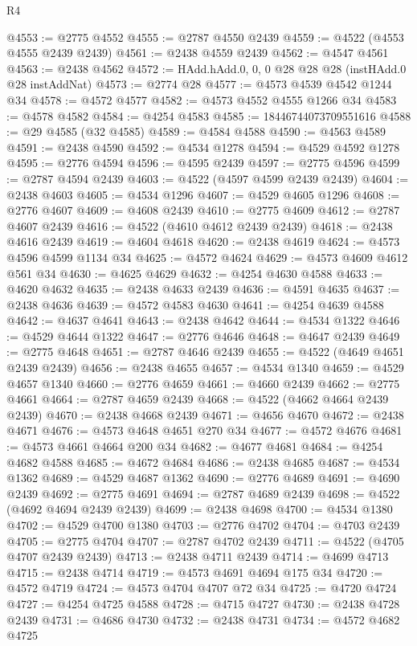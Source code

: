 \begin{lexlean}{R4}
\begin{coremodule}
@4553 := @2775 @4552
@4555 := @2787 @4550 @2439
@4559 := @4522 (@4553 @4555 @2439 @2439)
@4561 := @2438 @4559 @2439
@4562 := @4547 @4561
@4563 := @2438 @4562
@4572 := HAdd.hAdd.{0, 0, 0} @28 @28 @28 (instHAdd.{0} @28 instAddNat)
@4573 := @2774 @28
@4577 := @4573 @4539 @4542 @1244 @34
@4578 := @4572 @4577
@4582 := @4573 @4552 @4555 @1266 @34
@4583 := @4578 @4582
@4584 := @4254 @4583
@4585 := 18446744073709551616
@4588 := @29 @4585 (@32 @4585)
@4589 := @4584 @4588
@4590 := @4563 @4589
@4591 := @2438 @4590
@4592 := @4534 @1278
@4594 := @4529 @4592 @1278
@4595 := @2776 @4594
@4596 := @4595 @2439
@4597 := @2775 @4596
@4599 := @2787 @4594 @2439
@4603 := @4522 (@4597 @4599 @2439 @2439)
@4604 := @2438 @4603
@4605 := @4534 @1296
@4607 := @4529 @4605 @1296
@4608 := @2776 @4607
@4609 := @4608 @2439
@4610 := @2775 @4609
@4612 := @2787 @4607 @2439
@4616 := @4522 (@4610 @4612 @2439 @2439)
@4618 := @2438 @4616 @2439
@4619 := @4604 @4618
@4620 := @2438 @4619
@4624 := @4573 @4596 @4599 @1134 @34
@4625 := @4572 @4624
@4629 := @4573 @4609 @4612 @561 @34
@4630 := @4625 @4629
@4632 := @4254 @4630 @4588
@4633 := @4620 @4632
@4635 := @2438 @4633 @2439
@4636 := @4591 @4635
@4637 := @2438 @4636
@4639 := @4572 @4583 @4630
@4641 := @4254 @4639 @4588
@4642 := @4637 @4641
@4643 := @2438 @4642
@4644 := @4534 @1322
@4646 := @4529 @4644 @1322
@4647 := @2776 @4646
@4648 := @4647 @2439
@4649 := @2775 @4648
@4651 := @2787 @4646 @2439
@4655 := @4522 (@4649 @4651 @2439 @2439)
@4656 := @2438 @4655
@4657 := @4534 @1340
@4659 := @4529 @4657 @1340
@4660 := @2776 @4659
@4661 := @4660 @2439
@4662 := @2775 @4661
@4664 := @2787 @4659 @2439
@4668 := @4522 (@4662 @4664 @2439 @2439)
@4670 := @2438 @4668 @2439
@4671 := @4656 @4670
@4672 := @2438 @4671
@4676 := @4573 @4648 @4651 @270 @34
@4677 := @4572 @4676
@4681 := @4573 @4661 @4664 @200 @34
@4682 := @4677 @4681
@4684 := @4254 @4682 @4588
@4685 := @4672 @4684
@4686 := @2438 @4685
@4687 := @4534 @1362
@4689 := @4529 @4687 @1362
@4690 := @2776 @4689
@4691 := @4690 @2439
@4692 := @2775 @4691
@4694 := @2787 @4689 @2439
@4698 := @4522 (@4692 @4694 @2439 @2439)
@4699 := @2438 @4698
@4700 := @4534 @1380
@4702 := @4529 @4700 @1380
@4703 := @2776 @4702
@4704 := @4703 @2439
@4705 := @2775 @4704
@4707 := @2787 @4702 @2439
@4711 := @4522 (@4705 @4707 @2439 @2439)
@4713 := @2438 @4711 @2439
@4714 := @4699 @4713
@4715 := @2438 @4714
@4719 := @4573 @4691 @4694 @175 @34
@4720 := @4572 @4719
@4724 := @4573 @4704 @4707 @72 @34
@4725 := @4720 @4724
@4727 := @4254 @4725 @4588
@4728 := @4715 @4727
@4730 := @2438 @4728 @2439
@4731 := @4686 @4730
@4732 := @2438 @4731
@4734 := @4572 @4682 @4725

\end{coremodule}
\end{lexlean}
